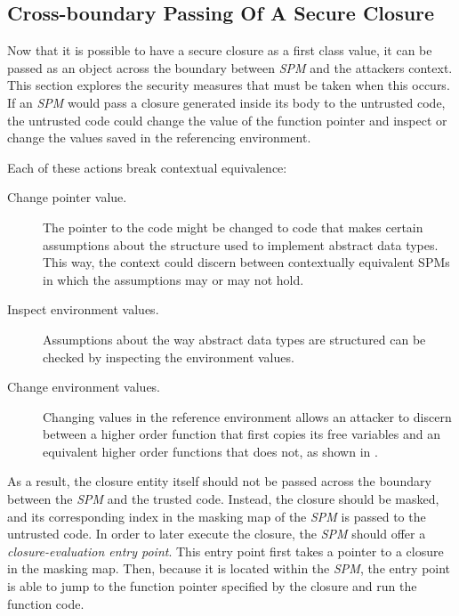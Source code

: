 \subsection{Cross-boundary Passing Of A Secure Closure }
Now that it is possible to have a secure closure as a first class value, it can be passed as an object across the boundary between \emph{SPM} and the attackers context.
This section explores the security measures that must be taken when this occurs.
If an \emph{SPM} would pass a closure generated inside its body to the untrusted code, the untrusted code could change the value of the function pointer and inspect or change the values saved in the referencing environment.

Each of these actions break contextual equivalence:
\begin{description}
\item[Change pointer value.] The pointer to the code might be changed to code that makes certain assumptions about the structure used to implement abstract data types.
This way, the context could discern between contextually equivalent SPMs in which the assumptions may or may not hold. 
\item[Inspect environment values.]
Assumptions about the way abstract data types are structured can be checked by inspecting the environment values.
\item[Change environment values.] Changing values in the reference environment allows an attacker to discern between a higher order function that first copies its free variables and an equivalent higher order functions that does not, as shown in .
\end{description}

As a result, the closure entity itself should not be passed across the boundary between the \emph{SPM} and the trusted code.
Instead, the closure should be masked, and its corresponding index in the masking map of the \emph{SPM} is passed to the untrusted code.
In order to later execute the closure, the \emph{SPM} should offer a \emph{closure-evaluation entry point}.
This entry point first takes a pointer to a closure in the masking map.
Then, because it is located within the \emph{SPM}, the entry point is able to jump to the function pointer specified by the closure and run the function code.

